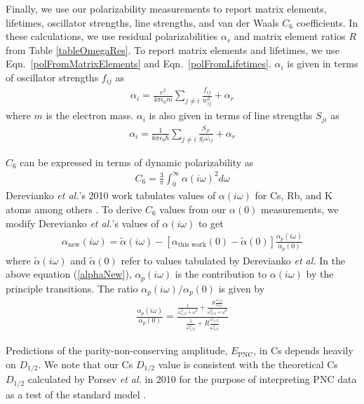 \documentclass[twocolumn,pra,showpacs,superscriptaddress,longbibliography]{revtex4-1}   %
\newcommand{\eqnref}[1]{Eqn.~\eqref{#1}}
\newcommand{\etal}{\textit{et al.}}
\newcommand{\etalspace}{\textit{et al. }}
\begin{document}
Finally, we use our polarizability measurements to report matrix elements, lifetimes, oscillator strengths, line strengths, and van der Waals $C_6$ coefficients.
In these calculations, we use residual polarizabilities $\alpha_r$ and matrix element ratios $R$ from Table \ref{tableOmegaRes}.
To report matrix elements and lifetimes, we use \eqnref{polFromMatrixElements} and \eqnref{polFromLifetimes}. $\alpha_i$ is given in terms of oscillator strengths $f_{ij}$ as 
\begin{align}
	\alpha_i = \frac{e^2}{4 \pi \epsilon_0 m}
	\sum_{j \neq i}
	\frac{f_{ij}}{w_{ij}^2}
	+ \alpha_r
	\label{polFromOscStr}
\end{align}
where $m$ is the electron mass. 
$\alpha_i$ is also given in terms of line strengths $S_{ji}$ as
\begin{align}
	\alpha_i = \frac{1}{6\pi\epsilon_0\hbar} 
	\sum_{j \neq i} 
	\frac{S_{ji}}{g_i\omega_{ij}}
	+ \alpha_r
	\label{polFromLineStr}
\end{align}


$C_6$ can be expressed in terms of dynamic polarizability as
\begin{align}
	C_6 = \frac{3}{\pi} \int_0^{\infty} \alpha(i\omega)^2 d\omega
	\label{C6fromPol}
\end{align}
Derevianko \etal's 2010 work tabulates values of $\alpha(i\omega)$ for Cs, Rb, and K atoms among others \cite{Derevianko2010}. To derive $C_6$ values from our $\alpha(0)$ measurements, we modify Derevianko \etal's values of $\alpha(i\omega)$ to get
\begin{align}
	\alpha_{\mathrm{new}}(i\omega) =
	\tilde{\alpha}(i\omega) -
	\left[\alpha_{\textrm{this work}}(0) - \tilde{\alpha}(0)\right]
	\frac{\alpha_p(i\omega)}{\alpha_p(0)}
	\label{alphaNew}
\end{align}
where $\tilde{\alpha}(i\omega)$ and $\tilde{\alpha}(0)$ refer to values tabulated by Derevianko \etalspace
In the above equation (\ref{alphaNew}), $\alpha_p(i\omega)$ is the contribution to $\alpha(i\omega)$ by the principle transitions. The ratio $\alpha_p(i\omega)/\alpha_p(0)$ is given by
\begin{align}
	\frac{\alpha_p(i\omega)}{\alpha_p(0)} = \frac
	{
		\frac{1}{\omega_{1/2}^2+\omega^2} + \frac{R\frac{\omega_{1/2}}{\omega_{3/2}}}{\omega_{3/2}^2+\omega^2}
	}
	{
		\frac{1}{\omega_{1/2}^2} + R\frac{\omega_{1/2}}{\omega^3_{3/2}}
	}
	\label{polPRatio}
\end{align}


Predictions of the parity-non-conserving amplitude, $E_{\mathrm{PNC}}$, in Cs depends heavily on $D_{1/2}$.
We note that our Cs $D_{1/2}$ value is consistent with the theoretical Cs $D_{1/2}$ calculated by Porsev \etalspace in 2010 for the purpose of interpreting PNC data as a test of the standard model \cite{Porsev2010}.
\end{document}
